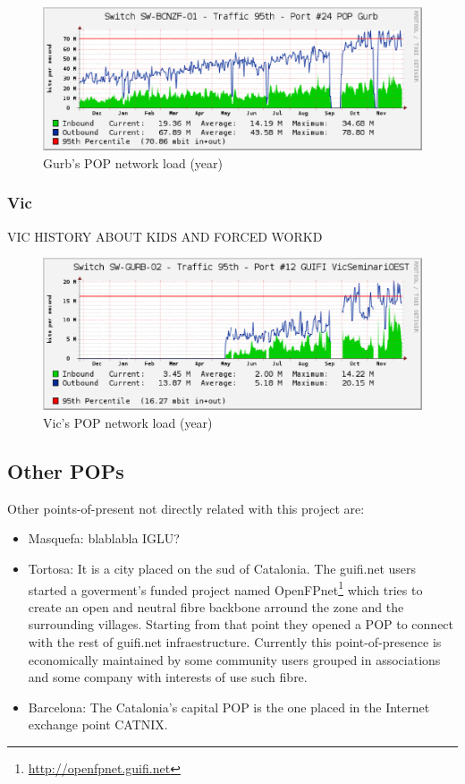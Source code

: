 \begin{figure}[htbp]
  \centering
  \includegraphics[scale=.65]{sect3/figures/gurb_network_load_year.eps} 
  \caption{Gurb's POP network load (year)}
  \label{fig:gurb_net_load}
\end{figure}


\subsubsection{Vic}

VIC HISTORY ABOUT KIDS AND FORCED WORKD

\begin{figure}[htbp]
  \centering
  \includegraphics[scale=.65]{sect3/figures/vic_network_load_year.eps} 
  \caption{Vic's POP network load (year)}
  \label{fig:vic_net_load}
\end{figure}



\subsection{Other POPs}

Other points-of-present not directly related with this project are:

\begin{itemize}
	\item Masquefa: blablabla IGLU?

	\item Tortosa: It is a city placed on the sud of Catalonia. The guifi.net users started a goverment's funded project named 
		OpenFPnet\footnote{\url{http://openfpnet.guifi.net}} which tries to create an open and neutral fibre backbone 
		arround the zone and the surrounding villages. Starting from that point they opened a POP to connect with the 
		rest of guifi.net infraestructure. Currently this point-of-presence is economically maintained by some community 
		users grouped in associations and some company with interests of use such fibre.

	\item Barcelona: The Catalonia's capital POP is the one placed in the Internet exchange point CATNIX.
\end{itemize}

